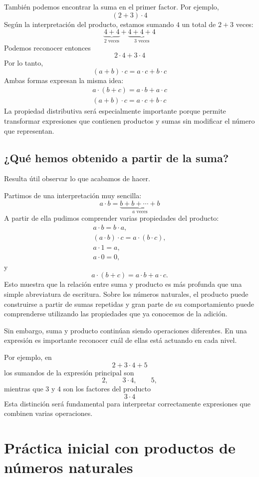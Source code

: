 También podemos encontrar la suma en el primer factor. Por ejemplo,
\[
(2+3)\cdot4
\]
Según la interpretación del producto, estamos sumando \(4\) un total de \(2+3\) veces:
\[
\underbrace{4+4}_{2\text{ veces}}
+
\underbrace{4+4+4}_{3\text{ veces}}
\]
Podemos reconocer entonces
\[
2\cdot4+3\cdot4
\]
Por lo tanto,
\[
(a+b)\cdot c
=
a\cdot c+b\cdot c
\]
Ambas formas expresan la misma idea:
\begin{gather*}
a\cdot(b+c)=a\cdot b+a\cdot c \\
(a+b)\cdot c=a\cdot c+b\cdot c
\end{gather*}
La propiedad distributiva será especialmente importante porque permite transformar expresiones que contienen productos y sumas sin modificar el número que representan.

\subsection{¿Qué hemos obtenido a partir de la suma?}

Resulta útil observar lo que acabamos de hacer.

Partimos de una interpretación muy sencilla:
\[
a\cdot b
=
\underbrace{b+b+\cdots+b}_{a\text{ veces}}
\]
A partir de ella pudimos comprender varias propiedades del producto:
\begin{gather*}
  a\cdot b=b\cdot a,\\
  (a\cdot b)\cdot c=a\cdot(b\cdot c),\\
  a\cdot1=a,\\
  a\cdot0=0,
\end{gather*}
y
\[
a\cdot(b+c)=a\cdot b+a\cdot c.
\]
Esto muestra que la relación entre suma y producto es más profunda que una simple abreviatura de escritura. Sobre los números naturales, el producto puede construirse a partir de sumas repetidas y gran parte de su comportamiento puede comprenderse utilizando las propiedades que ya conocemos de la adición.

Sin embargo, suma y producto continúan siendo operaciones diferentes. En una expresión es importante reconocer cuál de ellas está actuando en cada nivel.

Por ejemplo, en
\[
2+3\cdot4+5
\]
los sumandos de la expresión principal son
\[
2,\qquad3\cdot4,\qquad5,
\]
mientras que \(3\) y \(4\) son los factores del producto
\[
3\cdot4
\]
Esta distinción será fundamental para interpretar correctamente expresiones que combinen varias operaciones.


\section[Práctica inicial con productos]{Práctica inicial con productos de números naturales}

